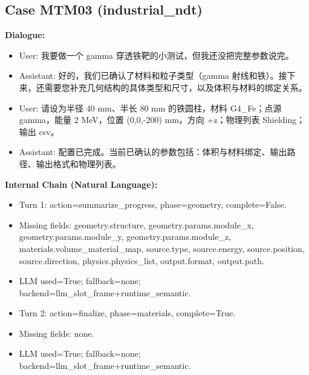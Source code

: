 \documentclass[11pt]{ctexart}
\begin{document}
\subsection{Case MTM03 (industrial\_ndt)}
\textbf{Dialogue:}
\begin{itemize}
\item User: 我要做一个 gamma 穿透铁靶的小测试，但我还没把完整参数说完。
\item Assistant: 好的，我们已确认了材料和粒子类型（gamma 射线和铁）。接下来，还需要您补充几何结构的具体类型和尺寸，以及体积与材料的绑定关系。
\item User: 请设为半径 40 mm、半长 80 mm 的铁圆柱，材料 G4\_Fe；点源 gamma，能量 2 MeV，位置 (0,0,-200) mm，方向 +z；物理列表 Shielding；输出 csv。
\item Assistant: 配置已完成。当前已确认的参数包括：体积与材料绑定、输出路径、输出格式和物理列表。
\end{itemize}
\textbf{Internal Chain (Natural Language):}
\begin{itemize}
\item Turn 1: action=summarize\_progress, phase=geometry, complete=False.
\item Missing fields: geometry.structure, geometry.params.module\_x, geometry.params.module\_y, geometry.params.module\_z, materials.volume\_material\_map, source.type, source.energy, source.position, source.direction, physics.physics\_list, output.format, output.path.
\item LLM used=True; fallback=none; backend=llm\_slot\_frame+runtime\_semantic.
\item Turn 2: action=finalize, phase=materials, complete=True.
\item Missing fields: none.
\item LLM used=True; fallback=none; backend=llm\_slot\_frame+runtime\_semantic.
\end{itemize}
\end{document}
